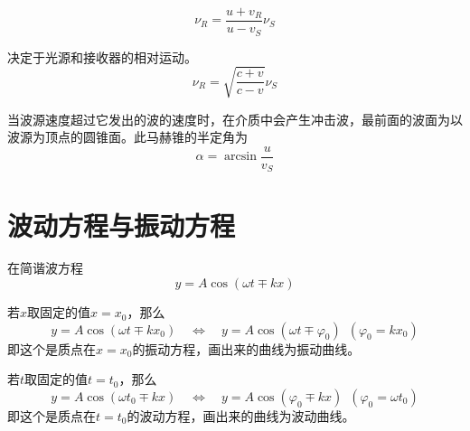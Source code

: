\par {}
\begin{equation}
\nu_R=\frac{u+v_R}{u-v_S}\nu_S
\end{equation}

\par \dya[光学多普勒效应] 决定于光源和接收器的相对运动。
\begin{equation}
\nu_R=\sqrt{\frac{c + v}{c - v}}\nu_S
\end{equation}

\par {}\jg 
\par 当波源速度超过它发出的波的速度时，在介质中会产生冲击波，最前面的波面为以波源为顶点的圆锥面。此马赫锥的半定角为
\begin{equation*}
\alpha = \arcsin\frac{u}{v_S}
\end{equation*}

\section{波动方程与振动方程}
在简谐波方程
\begin{equation*}
y =A\cos(\omega t \mp kx)
\end{equation*}
\par 若$x$取固定的值$x=x_0$，那么
\begin{equation*}
y =A\cos(\omega t \mp kx_0) \quad  \Longleftrightarrow \quad y =A\cos(\omega t \mp \varphi_0) \,\,\,(\varphi_0=kx_0)
\end{equation*}
即这个是质点在$x=x_0$的振动方程，画出来的曲线为振动曲线。\jg\jg
\par 若$t$取固定的值$t=t_0$，那么
\begin{equation*}
y =A\cos(\omega t_0 \mp kx) \quad  \Longleftrightarrow \quad y =A\cos(\varphi_0\mp kx) \,\,\,(\varphi_0=\omega t_0)
\end{equation*}
即这个是质点在$t=t_0$的波动方程，画出来的曲线为波动曲线。

